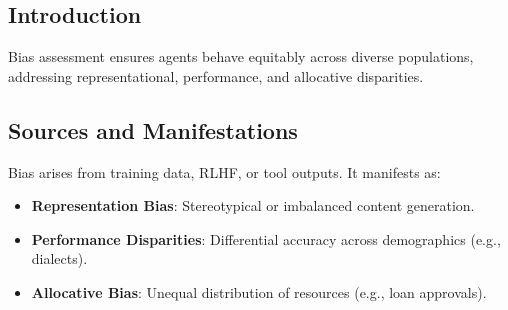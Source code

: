 \subsection{Introduction}
Bias assessment ensures agents behave equitably across diverse populations, addressing representational, performance, and allocative disparities.

\subsection{Sources and Manifestations}
Bias arises from training data, RLHF, or tool outputs. It manifests as:
\begin{itemize}
    \item \textbf{Representation Bias}: Stereotypical or imbalanced content generation.
    \item \textbf{Performance Disparities}: Differential accuracy across demographics (e.g., dialects).
    \item \textbf{Allocative Bias}: Unequal distribution of resources (e.g., loan approvals).
\end{itemize}

